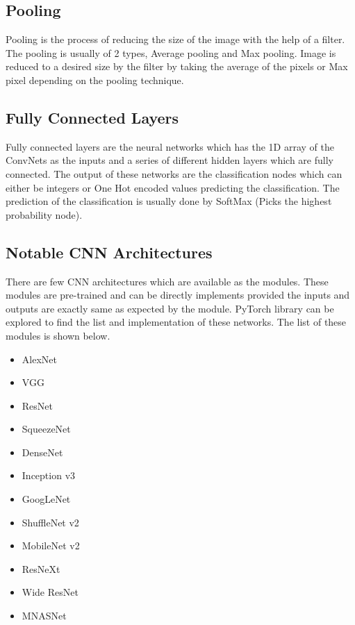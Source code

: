 \subsection{Pooling}
Pooling is the process of reducing the size of the image with the help of a filter. The pooling is usually of 2 types, Average pooling and Max pooling. Image is reduced to a desired size by the filter by taking the average of the pixels or Max pixel depending on the pooling technique.
\subsection{Fully Connected Layers}
Fully connected layers are the neural networks which has the 1D array of the ConvNets as the inputs and a series of different hidden layers which are fully connected. The output of these networks are the classification nodes which can either be integers or One Hot encoded values predicting the classification. The prediction of the classification is usually done by SoftMax (Picks the highest probability node).
\subsection{Notable CNN Architectures}
There are few CNN architectures which are available as the modules. These modules are pre-trained and can be directly implements provided the inputs and outputs are exactly same as expected by the module. PyTorch library can be explored to find the list and implementation of these networks. The list of these modules is shown below.
\begin{itemize}
	\item AlexNet
	\item VGG
	\item ResNet
	\item SqueezeNet
	\item DenseNet
	\item Inception v3
	\item GoogLeNet
	\item ShuffleNet v2
	\item MobileNet v2
	\item ResNeXt
	\item Wide ResNet
	\item MNASNet
\end{itemize}


  
